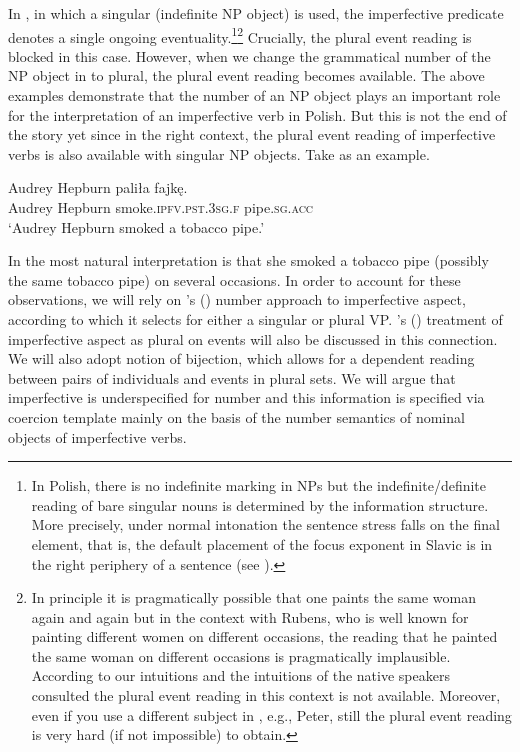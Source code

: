 \documentclass[output=paper]{langscibook}
\begin{document}
\noindent In , in which a singular (indefinite NP object) is used, the imperfective predicate denotes a single ongoing eventuality.\footnote{In Polish, there is no indefinite marking in NPs but the indefinite/definite reading of bare singular nouns is determined by the information structure. More precisely, under normal intonation the sentence stress falls on the final element, that is, the default placement of the focus exponent in Slavic is in the right periphery of a sentence (see \citealt{Junghanns2002Prinzipien}).}\footnote{In principle it is pragmatically possible that one paints the same woman again and again but in the context with Rubens, who is well known for painting different women on different occasions, the reading that he painted the same woman on different occasions is pragmatically implausible. According to our intuitions and the intuitions of the native speakers consulted the plural event reading in this context is not available. Moreover, even if you use a different subject in , e.g., Peter, still the plural event reading is very hard (if not impossible) to obtain.} Crucially, the plural event reading is blocked in this case. However, when we change the grammatical number of the NP object in  to plural, the plural event reading becomes available. The above examples demonstrate that the number of an NP object plays an important role for the interpretation of an imperfective verb in Polish. But this is not the end of the story yet since in the right context, the plural event reading of imperfective verbs is also available with singular NP objects. Take  as an example.

\ea
\gll Audrey Hepburn paliła fajkę.\label{jan-bla:fansb:kb:ex6}\\  
     Audrey Hepburn smoke.\textsc{ipfv}.\textsc{pst}.\textsc{3sg}.\textsc{f} pipe.\textsc{sg}.\textsc{acc}\\
\glt ‘Audrey Hepburn smoked a tobacco pipe.’
\z

\noindent In  the most natural interpretation is that she smoked a tobacco pipe (possibly the same tobacco pipe) on several occasions. In order to account for these observations, we will rely on \citeauthor{Ferreira2004}'s (\citeyear{Ferreira2004, Ferreira2005}) number approach to imperfective aspect, according to which it selects for either a singular or plural VP. \citeauthor{Kagan2008}'s (\citeyear{Kagan2008, Kagan2010}) treatment of imperfective aspect as plural on events will also be discussed in this connection. We will also adopt  notion of bijection, which allows for a dependent reading between pairs of individuals and events in plural sets. We will argue that imperfective is underspecified for number and this information is specified via  coercion template mainly on the basis of the number semantics of nominal objects of imperfective verbs.
\end{document}
